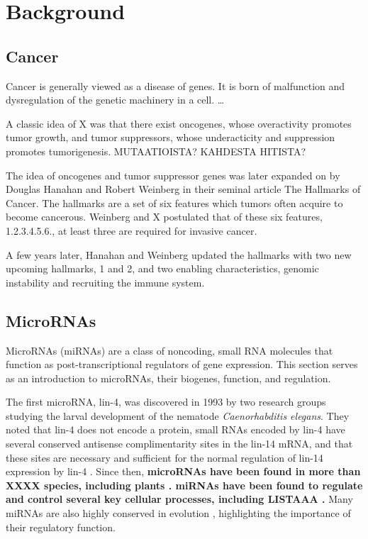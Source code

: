 


\section{Background}\label{background}






\subsection{Cancer}\label{cancer}

Cancer is generally viewed as a disease of genes. It is born of malfunction and
dysregulation of the genetic machinery in a cell.
\ldots{}

A classic idea of X was that there exist oncogenes, whose overactivity promotes
tumor growth, and tumor suppressors, whose underacticity and suppression
promotes tumorigenesis. MUTAATIOISTA? KAHDESTA HITISTA?

The idea of oncogenes and tumor suppressor genes was later expanded on by
Douglas Hanahan and Robert Weinberg in their seminal article The Hallmarks of
Cancer. The hallmarks are a set of six features which tumors often acquire to
become cancerous. Weinberg and X postulated that of these six features,
1.2.3.4.5.6., at least three are required for invasive cancer.

A few years later, Hanahan and Weinberg updated the hallmarks with two new
upcoming hallmarks, 1 and 2, and two enabling characteristics, genomic
instability and recruiting the immune system.










\subsection{MicroRNAs}\label{micrornas}

MicroRNAs (miRNAs) are a class of noncoding, small RNA molecules that function
as post-transcriptional regulators of gene expression. This section serves as an
introduction to microRNAs, their biogenes, function, and regulation.

The first microRNA, lin-4, was discovered in 1993 by two research groups
studying the larval development of the nematode \emph{Caenorhabditis elegans}.
They noted that lin-4 does not encode a protein, small RNAs encoded by lin-4
have several conserved antisense complimentarity sites in the lin-14 mRNA, and
that these sites are necessary and sufficient for the normal regulation of
lin-14 expression by lin-4 \cite{Lee1993,Wightman1993}. Since then,
\textbf{microRNAs have been found in more than XXXX species, including plants
\cite{CITE}. miRNAs have been found to regulate and control several key cellular
processes, including LISTAAA \cite{CITE}.} Many miRNAs are also highly conserved
in evolution \cite{Bartel2004}, highlighting the importance of their regulatory
function.

